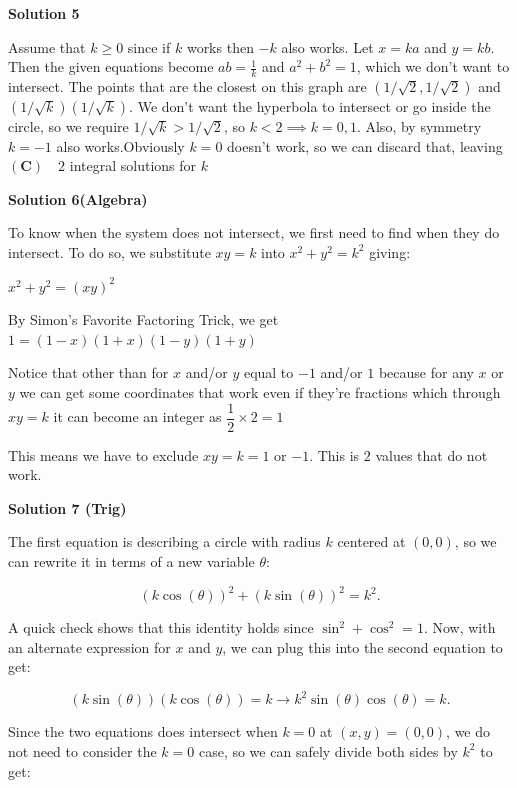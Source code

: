 \begin{enumerate}
 



\textbf{Solution 5}

Assume that $k\ge 0$ since if $k$ works then $-k$ also works. Let $x = ka$ and $y = kb$. Then the given equations become $ab = \frac{1}{k}$ and $a^2 + b^2 = 1$, which we don't want to intersect. The points that are the closest on this graph are $(1/\sqrt{2}, 1/\sqrt{2})$ and $(1/\sqrt{k})(1/\sqrt{k})$. We don't want the hyperbola to intersect or go inside the circle, so we require $1/\sqrt{k} > 1/\sqrt{2}$, so $k< 2\implies k = 0, 1$. Also, by symmetry $k = -1$ also works.Obviously $k = 0$ doesn't work, so we can discard that, leaving $\boxed{\mathbf{(C)}\quad 2}$ integral solutions for $k$




\textbf{Solution 6(Algebra)}

To know when the system does not intersect, we first need to find when they do intersect. To do so, we substitute $xy=k$ into $x^{2}+y^{2}=k^{2}$ giving:

 $x^2+y^2=(xy)^2$

 By Simon's Favorite Factoring Trick, we get $1=(1-x)(1+x)(1-y)(1+y)$

 Notice that other than for $x$ and/or $y$ equal to $-1$ and/or $1$ because for any $x$ or $y$ we can get some coordinates that work even if they're fractions which through $xy=k$ it can become an integer as $\dfrac{1}{2}\times2=1$

 This means we have to exclude $xy=k=1$ or $-1$. This is $\boxed{2}$ values that do not work.

 



\textbf{Solution 7 (Trig)}

The first equation is describing a circle with radius $k$ centered at $(0,0)$, so we can rewrite it in terms of a new variable $\theta$:

 
 \[(k\cos(\theta))^2+(k\sin(\theta))^2=k^2.\]

 A quick check shows that this identity holds since $\sin^2+\cos^2=1$. Now, with an alternate expression for $x$ and $y$, we can plug this into the second equation to get:

 
 \[(k\sin(\theta))(k\cos(\theta))=k\rightarrow k^2\sin(\theta)\cos(\theta)=k.\]

 Since the two equations does intersect when $k=0$ at $(x,y)=(0,0)$, we do not need to consider the $k=0$ case, so we can safely divide both sides by $k^2$ to get:


\end{enumerate}
